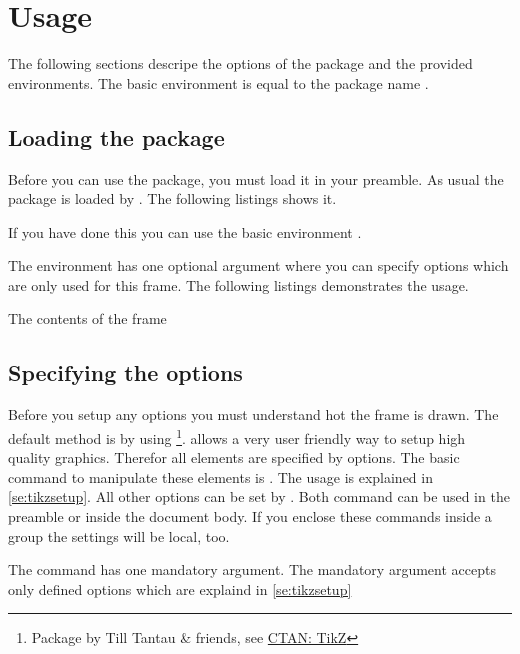 \documentclass[openany,12pt,tocdepth=3]{ltx-md}
\begin{document}
\chapter{Usage}\label{chap:usage}
The following sections descripe the options of the package and the provided 
environments. The basic environment is equal to the package name .

\section{Loading the package}
Before you can use the package, you must load it in your preamble. As usual the 
package is loaded by . The following listings shows it.
\begin{ltxexample}[caption=Loading the package,label=loading]
 \usepackage{xframed}
\end{ltxexample}
If you have done this you can use the basic environment .

The environment has one optional argument where you can specify options
which are only used for this frame. The following listings demonstrates the usage.
\begin{ltxexample}[caption=Loading the package,label=loading]
 \begin{xframed}
   The contents of the frame
 \end{xframed}
\end{ltxexample}

\section{Specifying the options}\label{sec:specopt}
Before you setup any options you must understand hot the frame is drawn.
The default method is by using \footnote{Package  by 
Till Tantau \& friends, see \href{http://www.ctan.org/pkg/pgf}{CTAN: TikZ}}. 
 allows a very user friendly way to setup high quality graphics. 
Therefor all elements are specified by  options. The basic command
to manipulate these elements is . The usage is explained
in \autoref{se:tikzsetup}.  All other options can be set by . 
Both command can be used in the preamble or inside the document body. If
you enclose these commands inside a group the settings will be local, too.
 
The command has one mandatory argument. The mandatory argument accepts only
defined options which are explaind in \autoref{se:tikzsetup}
\end{document}
